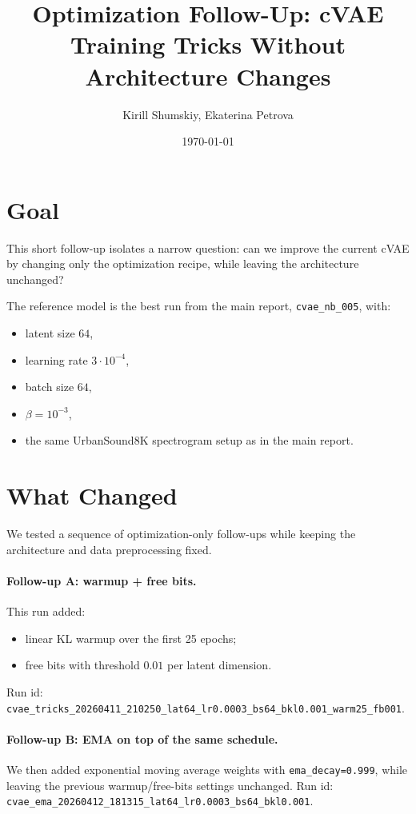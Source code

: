 \documentclass[10pt]{article}
\title{Optimization Follow-Up: cVAE Training Tricks Without Architecture Changes}
\author{Kirill Shumskiy, Ekaterina Petrova}
\date{\today}
\begin{document}
\maketitle

\section{Goal}
This short follow-up isolates a narrow question: can we improve the current cVAE by changing only the optimization recipe, while leaving the architecture unchanged?

The reference model is the best run from the main report, \texttt{cvae\_nb\_005}, with:
\begin{itemize}
\item latent size \(64\),
\item learning rate \(3 \cdot 10^{-4}\),
\item batch size \(64\),
\item \(\beta = 10^{-3}\),
\item the same UrbanSound8K spectrogram setup as in the main report.
\end{itemize}

\section{What Changed}
We tested a sequence of optimization-only follow-ups while keeping the architecture and data preprocessing fixed.

\paragraph{Follow-up A: warmup + free bits.}
This run added:
\begin{itemize}
\item linear KL warmup over the first 25 epochs;
\item free bits with threshold \(0.01\) per latent dimension.
\end{itemize}
Run id:
\texttt{cvae\_tricks\_20260411\_210250\_lat64\_lr0.0003\_bs64\_bkl0.001\_warm25\_fb001}.

\paragraph{Follow-up B: EMA on top of the same schedule.}
We then added exponential moving average weights with \texttt{ema\_decay=0.999},
while leaving the previous warmup/free-bits settings unchanged.
Run id:
\texttt{cvae\_ema\_20260412\_181315\_lat64\_lr0.0003\_bs64\_bkl0.001}.
\end{document}
